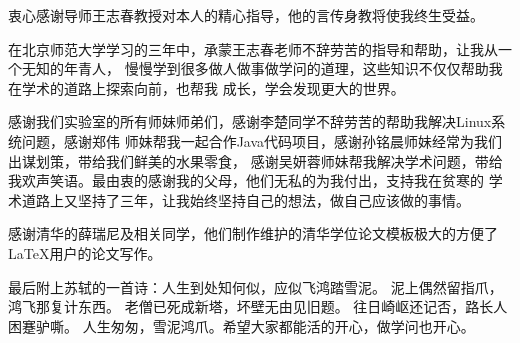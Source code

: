 
\begin{ack}
  衷心感谢导师王志春教授对本人的精心指导，他的言传身教将使我终生受益。

  在北京师范大学学习的三年中，承蒙王志春老师不辞劳苦的指导和帮助，让我从一个无知的年青人，
  慢慢学到很多做人做事做学问的道理，这些知识不仅仅帮助我在学术的道路上探索向前，也帮我
  成长，学会发现更大的世界。

  感谢我们实验室的所有师妹师弟们，感谢李楚同学不辞劳苦的帮助我解决Linux系统问题，感谢郑伟
  师妹帮我一起合作Java代码项目，感谢孙铭晨师妹经常为我们出谋划策，带给我们鲜美的水果零食，
  感谢吴妍蓉师妹帮我解决学术问题，带给我欢声笑语。最由衷的感谢我的父母，他们无私的为我付出，支持我在贫寒的
  学术道路上又坚持了三年，让我始终坚持自己的想法，做自己应该做的事情。

  感谢清华的薛瑞尼及相关同学，他们制作维护的清华学位论文模板极大的方便了\LaTeX{}用户的论文写作。

  最后附上苏轼的一首诗：{\kai 人生到处知何似，应似飞鸿踏雪泥。
  泥上偶然留指爪，鸿飞那复计东西。
  老僧已死成新塔，坏壁无由见旧题。
  往日崎岖还记否，路长人困蹇驴嘶。}
  人生匆匆，雪泥鸿爪。希望大家都能活的开心，做学问也开心。

\end{ack}
